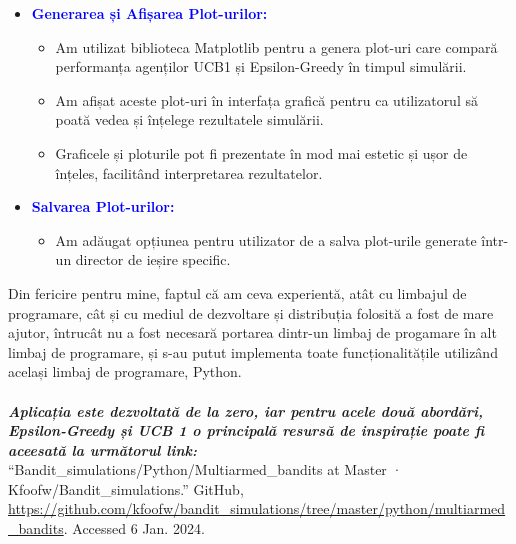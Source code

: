 \documentclass{article}
\begin{document}
\begin{itemize}
\item\textbf{\textcolor{blue}{Generarea și Afișarea Plot-urilor:}} \vspace{2mm}
\begin{itemize}
      \item Am utilizat biblioteca Matplotlib pentru a genera plot-uri care compară performanța agenților UCB1 și Epsilon-Greedy în timpul simulării.\vspace{2mm}
       \item Am afișat aceste plot-uri în interfața grafică pentru ca utilizatorul să poată vedea și înțelege rezultatele simulării.\vspace{2mm}
        \item Graficele și ploturile pot fi prezentate în mod mai estetic și ușor de înțeles, facilitând interpretarea rezultatelor.\vspace{2mm}
\end{itemize}

\item\textbf{\textcolor{blue}{ Salvarea Plot-urilor:}} \vspace{2mm}
\begin{itemize}
      \item Am adăugat opțiunea pentru utilizator de a salva plot-urile generate într-un director de ieșire specific.\vspace{2mm}
\end{itemize}
\end{itemize}
Din fericire pentru mine, faptul că am ceva experientă, atât cu limbajul de programare, cât și cu mediul de dezvoltare și distribuția folosită a fost de mare ajutor, întrucât nu a fost necesară portarea dintr-un limbaj de progamare în alt limbaj de programare, și s-au putut implementa toate funcționalitățile utilizând același limbaj de programare, Python.\\\\
\textbf{\textit{Aplicația este dezvoltată de la zero, iar pentru acele două abordări, Epsilon-Greedy și UCB 1 o principală resursă de inspirație poate fi aceesată la următorul link:\\}}
“Bandit\_simulations/Python/Multiarmed\_bandits at Master · Kfoofw/Bandit\_simulations.” GitHub,  {\small \url{https://github.com/kfoofw/bandit_simulations/tree/master/python/multiarmed_bandits}}. Accessed 6 Jan. 2024.
\vspace{20mm}
\end{document}
